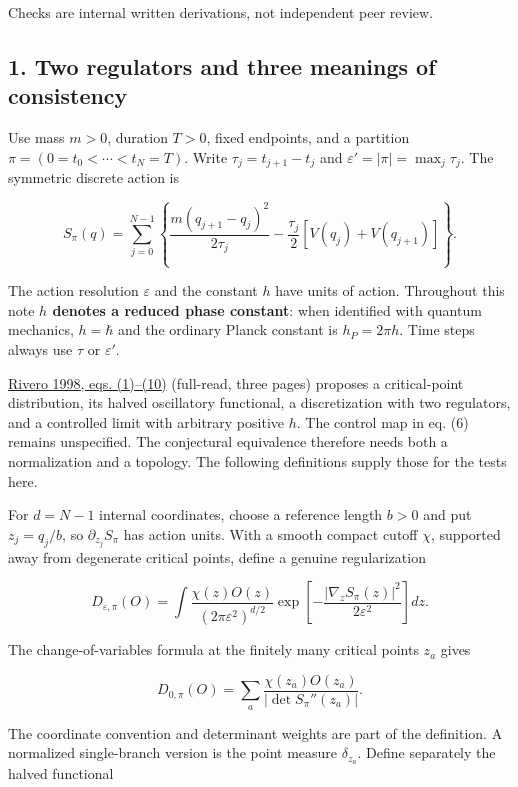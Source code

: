 \documentclass[11pt,a4paper]{article}
\begin{document}
Checks are internal written derivations, not independent peer review.

\hypertarget{two-regulators-and-three-meanings-of-consistency}{%
\subsection{1. Two regulators and three meanings of
consistency}\label{two-regulators-and-three-meanings-of-consistency}}

Use mass \(m>0\), duration \(T>0\), fixed endpoints, and a partition
\(\pi=(0=t_0<\cdots<t_N=T)\). Write \(\tau_j=t_{j+1}-t_j\) and
\(\varepsilon'=|\pi|=\max_j\tau_j\). The symmetric discrete action is

\[
S_\pi(q)=\sum_{j=0}^{N-1}\left\{
\frac{m(q_{j+1}-q_j)^2}{2\tau_j}
-\frac{\tau_j}{2}[V(q_j)+V(q_{j+1})]\right\}. \tag{1}
\]

The action resolution \(\varepsilon\) and the constant \(h\) have units
of action. Throughout this note \textbf{\(h\) denotes a reduced phase
constant}: when identified with quantum mechanics, \(h=\hbar\) and the
ordinary Planck constant is \(h_P=2\pi h\). Time steps always use
\(\tau\) or \(\varepsilon'\).

\href{https://arxiv.org/pdf/quant-ph/9803035}{Rivero 1998, eqs.
(1)--(10)} (full-read, three pages) proposes a critical-point
distribution, its halved oscillatory functional, a discretization with
two regulators, and a controlled limit with arbitrary positive \(h\).
The control map in eq. (6) remains unspecified. The conjectural
equivalence therefore needs both a normalization and a topology. The
following definitions supply those for the tests here.

For \(d=N-1\) internal coordinates, choose a reference length \(b>0\)
and put \(z_j=q_j/b\), so \(\partial_{z_j}S_\pi\) has action units. With
a smooth compact cutoff \(\chi\), supported away from degenerate
critical points, define a genuine regularization

\[
D_{\varepsilon,\pi}(O)=
\int\frac{\chi(z)O(z)}{(2\pi\varepsilon^2)^{d/2}}
\exp\left[-\frac{|\nabla_z S_\pi(z)|^2}{2\varepsilon^2}\right]dz.
\]

The change-of-variables formula at the finitely many critical points
\(z_a\) gives

\[
D_{0,\pi}(O)=\sum_a
\frac{\chi(z_a)O(z_a)}{|\det S_\pi''(z_a)|}. \tag{2}
\]

The coordinate convention and determinant weights are part of the
definition. A normalized single-branch version is the point measure
\(\delta_{z_a}\). Define separately the halved functional
\end{document}
